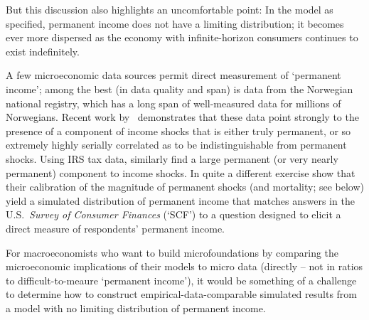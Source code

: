 \documentclass[\econtexRoot/BufferStockTheory]{subfiles}
\begin{document}
But this discussion also highlights an uncomfortable point: In the model as specified, permanent income does not have a limiting distribution; it becomes ever more dispersed as the economy with infinite-horizon consumers continues to exist indefinitely.

A few microeconomic data sources permit direct measurement of `permanent income'; among the best (in data quality and span) is data from the Norwegian national registry, which has a long span of well-measured data for millions of Norwegians. Recent work by~\cite{crawleyParsimonious} demonstrates that these data point strongly to the presence of a component of income shocks that is either truly permanent, or so extremely highly serially correlated as to be indistinguishable from permanent shocks.  Using IRS tax data, \cite{dhprvInequality} similarly find a large permanent (or very nearly permanent) component to income shocks. In quite a different exercise \cite{cstwMPC} show that their calibration of the magnitude of permanent shocks (and mortality; see below) yield a simulated distribution of permanent income that matches answers in the U.S.\ \emph{Survey of Consumer Finances} (`SCF') to a question designed to elicit a direct measure of respondents' permanent income. %

For macroeconomists who want to build microfoundations by comparing the microeconomic implications of their models to micro data (directly -- not in ratios to difficult-to-meaure `permanent income'), it would be something of a challenge to determine how to construct empirical-data-comparable simulated results from a model with no limiting distribution of permanent income.
\end{document}
